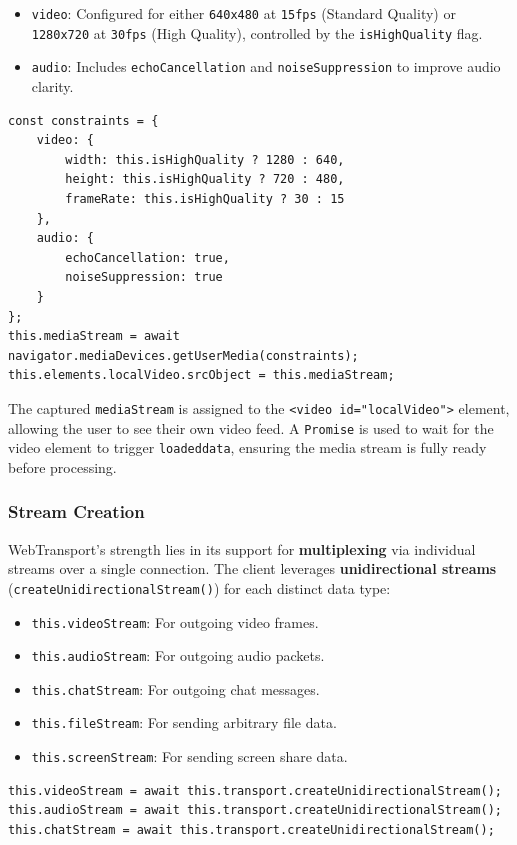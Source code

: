 \begin{itemize}
    \item \texttt{video}: Configured for either \texttt{640x480} at \texttt{15fps} (Standard Quality) or \texttt{1280x720} at \texttt{30fps} (High Quality), controlled by the \texttt{isHighQuality} flag.
    \item \texttt{audio}: Includes \texttt{echoCancellation} and \texttt{noiseSuppression} to improve audio clarity.
\end{itemize}

\begin{lstlisting}
const constraints = {
    video: {
        width: this.isHighQuality ? 1280 : 640,
        height: this.isHighQuality ? 720 : 480,
        frameRate: this.isHighQuality ? 30 : 15
    },
    audio: {
        echoCancellation: true,
        noiseSuppression: true
    }
};
this.mediaStream = await navigator.mediaDevices.getUserMedia(constraints);
this.elements.localVideo.srcObject = this.mediaStream;
\end{lstlisting}

The captured \texttt{mediaStream} is assigned to the \texttt{<video id="localVideo">} element, allowing the user to see their own video feed. A \texttt{Promise} is used to wait for the video element to trigger \texttt{loadeddata}, ensuring the media stream is fully ready before processing.

\subsubsection{Stream Creation}
WebTransport's strength lies in its support for \textbf{multiplexing} via individual streams over a single connection. The client leverages \textbf{unidirectional streams} (\texttt{createUnidirectionalStream()}) for each distinct data type:

\begin{itemize}
    \item \texttt{this.videoStream}: For outgoing video frames.
    \item \texttt{this.audioStream}: For outgoing audio packets.
    \item \texttt{this.chatStream}: For outgoing chat messages.
    \item \texttt{this.fileStream}: For sending arbitrary file data.
    \item \texttt{this.screenStream}: For sending screen share data.
\end{itemize}

\begin{lstlisting}
this.videoStream = await this.transport.createUnidirectionalStream();
this.audioStream = await this.transport.createUnidirectionalStream();
this.chatStream = await this.transport.createUnidirectionalStream();
\end{lstlisting}

